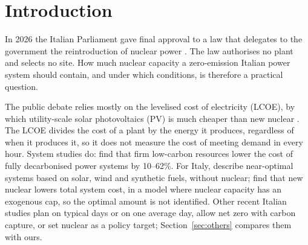 \section{Introduction}\label{sec:intro}

In 2026 the Italian Parliament gave final approval to a law that delegates to the government the reintroduction of nuclear power \citep{Delega2026}. The law authorises no plant and selects no site. How much nuclear capacity a zero-emission Italian power system should contain, and under which conditions, is therefore a practical question.

The public debate relies mostly on the levelised cost of electricity (LCOE), by which utility-scale solar photovoltaics (PV) is much cheaper than new nuclear \citep{IEA2024WEO,FraunhoferEN2024}. The LCOE divides the cost of a plant by the energy it produces, regardless of when it produces it, so it does not measure the cost of meeting demand in every hour. System studies do: \citet{Sepulveda2018} find that firm low-carbon resources lower the cost of fully decarbonised power systems by 10--62\%. For Italy, \citet{Lombardi2020} describe near-optimal systems based on solar, wind and synthetic fuels, without nuclear; \citet{Mastrantuono2026} find that new nuclear lowers total system cost, in a model where nuclear capacity has an exogenous cap, so the optimal amount is not identified. Other recent Italian studies plan on typical days or on one average day, allow net zero with carbon capture, or set nuclear as a policy target; Section~\ref{sec:others} compares them with ours.

